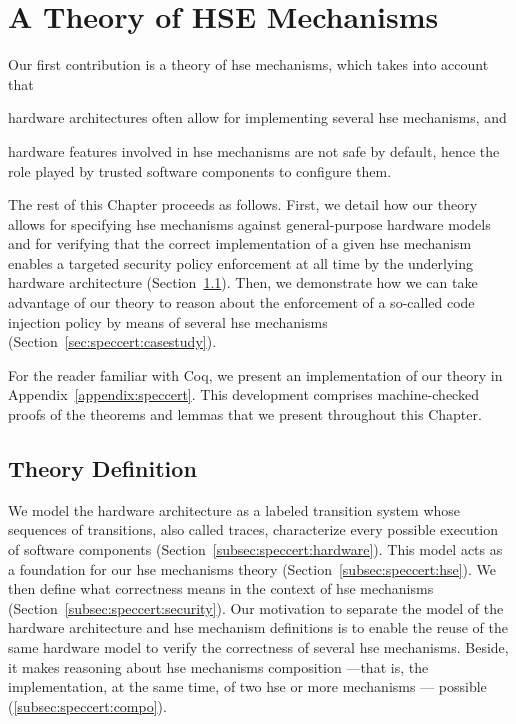 \chapter{A Theory of HSE Mechanisms}
\label{chapter:speccert}


\vspace{1cm}%
\noindent
%
Our first contribution is a theory of \ac{hse} mechanisms, which takes into
account that
%
\begin{inparaenum}[(1)]
\item hardware architectures often allow for implementing several \ac{hse}
  mechanisms, and
\item hardware features involved in \ac{hse} mechanisms are not safe by default,
  hence the role played by trusted software components to configure them.
\end{inparaenum}
%
The rest of this Chapter proceeds as follows.
%
First, we detail how our theory allows for specifying \ac{hse} mechanisms
against general-purpose hardware models and for verifying that the correct
implementation of a given \ac{hse} mechanism enables a targeted security policy
enforcement at all time by the underlying hardware architecture
(Section~\ref{sec:speccert:theory}).
%
Then, we demonstrate how we can take advantage of our theory to reason about the
enforcement of a so-called code injection policy by means of several \ac{hse}
mechanisms (Section~\ref{sec:speccert:casestudy}).

For the reader familiar with Coq, we present an implementation of our theory
in Appendix~\ref{appendix:speccert}.
%
This development comprises machine-checked proofs of the theorems and lemmas
that we present throughout this Chapter.

\section{Theory Definition}
\label{sec:speccert:theory}

We model the hardware architecture as a labeled transition system whose
sequences of transitions, also called traces, characterize every possible
execution of software components (Section~\ref{subsec:speccert:hardware}).
%
This model acts as a foundation for our \ac{hse} mechanisms theory
(Section~\ref{subsec:speccert:hse}).
%
We then define what correctness means in the context of \ac{hse} mechanisms
(Section~\ref{subsec:speccert:security}).
%
Our motivation to separate the model of the hardware architecture and \ac{hse}
mechanism definitions is to enable the reuse of the same hardware model to
verify the correctness of several \ac{hse} mechanisms.
%
Beside, it makes reasoning about \ac{hse} mechanisms composition ---that is, the
implementation, at the same time, of two \ac{hse} or more mechanisms ---
possible (\ref{subsec:speccert:compo}).

